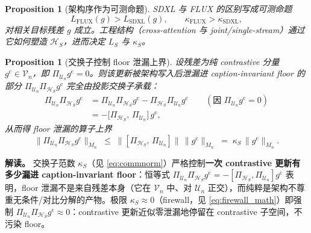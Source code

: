 \documentclass[11pt,a4paper]{article}
\newtheorem{proposition}[theorem]{Proposition}
\newcommand{\cH}{\mathcal{H}}
\newcommand{\cU}{\mathcal{U}}
\newcommand{\cV}{\mathcal{V}}
\newcommand{\ProjectOp}{\Pi}
\newcommand{\cc}{\mathrm{c}}
\begin{document}
\begin{proposition}[架构序作为可测命题]\label{prop:arch_measurable}
SDXL 与 FLUX 的区别写成可测命题
\begin{equation}\label{eq:arch_order}
L_{\mathrm{FLUX}}(g) > L_{\mathrm{SDXL}}(g),\qquad \kappa_{\mathrm{FLUX}} > \kappa_{\mathrm{SDXL}},
\end{equation}
对相关目标残差 $g$ 成立。工程结构（cross-attention 与 joint/single-stream）通过它如何塑造 $\cH_S$，进而决定 $L_S$ 与 $\kappa_S$。
\end{proposition}

\begin{proposition}[交换子控制 floor 泄漏上界]\label{prop:commutator_leak}
设残差为纯 contrastive 分量 $g^{\cc}\in\cV_n$，即 $\ProjectOp_{\cU_n}g^{\cc}=0$。则该更新被架构写入后泄漏进 caption-invariant floor 的部分 $\ProjectOp_{\cU_n}\ProjectOp_{\cH_S}g^{\cc}$ 完全由投影交换子承载：
\begin{align*}
\ProjectOp_{\cU_n}\ProjectOp_{\cH_S}g^{\cc}
&= \ProjectOp_{\cU_n}\ProjectOp_{\cH_S}g^{\cc}-\ProjectOp_{\cH_S}\ProjectOp_{\cU_n}g^{\cc}
\qquad(\text{因 }\ProjectOp_{\cU_n}g^{\cc}=0)\\
&= -\bigl[\ProjectOp_{\cH_S},\,\ProjectOp_{\cU_n}\bigr]\,g^{\cc},
\end{align*}
从而得 floor 泄漏的算子上界
\begin{equation}\label{eq:commutator_leak}
\boxed{
\bigl\|\ProjectOp_{\cU_n}\ProjectOp_{\cH_S}g^{\cc}\bigr\|_{M_n}
\;\le\;
\bigl\|[\ProjectOp_{\cH_S},\,\ProjectOp_{\cU_n}]\bigr\|\,\bigl\|g^{\cc}\bigr\|_{M_n}
\;=\;
\kappa_S\,\bigl\|g^{\cc}\bigr\|_{M_n}.
}
\end{equation}
\end{proposition}

\noindent\textbf{解读。} 交换子范数 $\kappa_S$（见 \eqref{eq:commnorm}）严格控制\textbf{一次 contrastive 更新有多少漏进 caption-invariant floor}：恒等式 $\ProjectOp_{\cU_n}\ProjectOp_{\cH_S}g^{\cc}=-[\ProjectOp_{\cH_S},\ProjectOp_{\cU_n}]g^{\cc}$ 表明，floor 泄漏不是来自残差本身（它在 $\cV_n$ 中、对 $\cU_n$ 正交），而纯粹是架构不尊重无条件/对比分解的产物。极限 $\kappa_S\approx 0$（firewall，见 \eqref{eq:firewall_math}）即强制 $\ProjectOp_{\cU_n}\ProjectOp_{\cH_S}g^{\cc}\approx 0$：contrastive 更新近似零泄漏地停留在 contrastive 子空间，不污染 floor。
\end{document}
